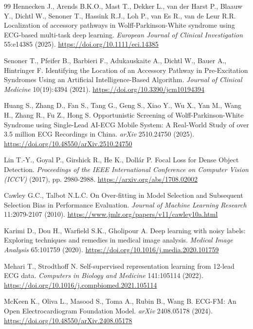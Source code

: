 \documentclass[11pt]{article}
\begin{document}
\begin{thebibliography}{99}
Hennecken J., Arends B.K.O., Mast T., Dekker L., van der Harst P., Blaauw Y., Dichtl W., Senoner T., Hassink R.J., Loh P., van Es R., van de Leur R.R. Localization of accessory pathways in Wolff-Parkinson-White syndrome using ECG-based multi-task deep learning. \textit{European Journal of Clinical Investigation} 55:e14385 (2025). \url{https://doi.org/10.1111/eci.14385}

Senoner T., Pfeifer B., Barbieri F., Adukauskaite A., Dichtl W., Bauer A., Hintringer F. Identifying the Location of an Accessory Pathway in Pre-Excitation Syndromes Using an Artificial Intelligence-Based Algorithm. \textit{Journal of Clinical Medicine} 10(19):4394 (2021). \url{https://doi.org/10.3390/jcm10194394}

Huang S., Zhang D., Fan S., Tang G., Geng S., Xiao Y., Wu X., Yan M., Wang H., Zhang R., Fu Z., Hong S. Opportunistic Screening of Wolff-Parkinson-White Syndrome using Single-Lead AI-ECG Mobile System: A Real-World Study of over 3.5 million ECG Recordings in China. \textit{arXiv} 2510.24750 (2025). \url{https://doi.org/10.48550/arXiv.2510.24750}

Lin T.-Y., Goyal P., Girshick R., He K., Doll\'ar P. Focal Loss for Dense Object Detection. \textit{Proceedings of the IEEE International Conference on Computer Vision (ICCV)} (2017), pp. 2980-2988. \url{https://arxiv.org/abs/1708.02002}

Cawley G.C., Talbot N.L.C. On Over-fitting in Model Selection and Subsequent Selection Bias in Performance Evaluation. \textit{Journal of Machine Learning Research} 11:2079-2107 (2010). \url{https://www.jmlr.org/papers/v11/cawley10a.html}

Karimi D., Dou H., Warfield S.K., Gholipour A. Deep learning with noisy labels: Exploring techniques and remedies in medical image analysis. \textit{Medical Image Analysis} 65:101759 (2020). \url{https://doi.org/10.1016/j.media.2020.101759}

Mehari T., Strodthoff N. Self-supervised representation learning from 12-lead ECG data. \textit{Computers in Biology and Medicine} 141:105114 (2022). \url{https://doi.org/10.1016/j.compbiomed.2021.105114}

McKeen K., Oliva L., Masood S., Toma A., Rubin B., Wang B. ECG-FM: An Open Electrocardiogram Foundation Model. \textit{arXiv} 2408.05178 (2024). \url{https://doi.org/10.48550/arXiv.2408.05178}


\end{thebibliography}
\end{document}
